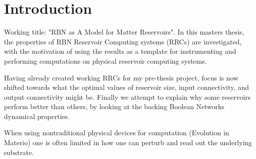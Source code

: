 \chapter{Introduction}

Working title: "RBN as A Model for Matter Reservoirs".
In this masters thesis, the properties of RBN Reservoir Computing systems (RRCs) are investigated,
with the motivation of using the results as a template for instrumenting and performing computations on physical reservoir computing systems.

Having already created working RRCs for my pre-thesis project,
focus is now shifted towards what the optimal values of reservoir size, input connectivity, and output connectivity might be.
Finally we attempt to explain why some reservoirs perform better than others,
by looking at the backing Boolean Networks dynamical properties.

When using nontraditional physical devices for computation (Evolution in Materio) one is often limited in how one can perturb and read out the underlying substrate.

\cleardoublepage
